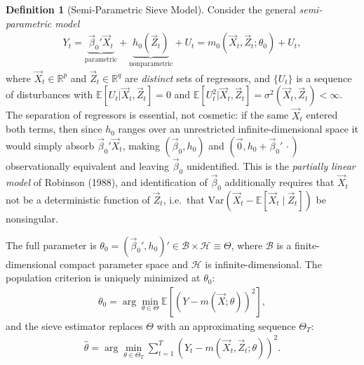 \documentclass[11pt]{article}
\theoremstyle{definition}
\newtheorem{definition}{Definition}[section]
\theoremstyle{plain}
\theoremstyle{remark}
\begin{document}
\begin{definition}[Semi-Parametric Sieve Model]
    Consider the general \textit{semi-parametric model}
    \begin{align}
        Y_t = \underbrace{\vec{\beta}_0' \vec{X}_t}_{\text{parametric}} + \underbrace{h_0(\vec{Z}_t)}_{\text{nonparametric}} + U_t = m_0(\vec{X}_t, \vec{Z}_t; \theta_0) + U_t,
    \end{align}
    where $\vec{X}_t \in \mathbb{R}^p$ and $\vec{Z}_t \in \mathbb{R}^q$ are \emph{distinct} sets of regressors, and $\{U_t\}$ is a sequence of disturbances with $\mathbb{E}[U_t | \vec{X}_t, \vec{Z}_t] = 0$ and $\mathbb{E}[U_t^2 | \vec{X}_t, \vec{Z}_t] = \sigma^2(\vec{X}_t,\vec{Z}_t) < \infty$. The separation of regressors is essential, not cosmetic: if the same $\vec{X}_t$ entered both terms, then since $h_0$ ranges over an unrestricted infinite-dimensional space it would simply absorb $\vec{\beta}_0'\vec{X}_t$, making $(\vec{\beta}_0, h_0)$ and $(\vec{0}, h_0 + \vec{\beta}_0'\,\cdot)$ observationally equivalent and leaving $\vec{\beta}_0$ unidentified. This is the \emph{partially linear model} of Robinson (1988), and identification of $\vec{\beta}_0$ additionally requires that $\vec{X}_t$ not be a deterministic function of $\vec{Z}_t$, i.e.\ that $\mathrm{Var}(\vec{X}_t - \mathbb{E}[\vec{X}_t \mid \vec{Z}_t])$ be nonsingular.

    The full parameter is $\theta_0 = (\vec{\beta}_0', h_0)' \in \mathcal{B} \times \mathcal{H} \equiv \Theta$, where $\mathcal{B}$ is a finite-dimensional compact parameter space and $\mathcal{H}$ is infinite-dimensional. The population criterion is uniquely minimized at $\theta_0$:
    \begin{align}
        \theta_0 = \arg\min_{\theta \in \Theta} \mathbb{E}\!\left[\left(Y - m(\vec{X};\theta)\right)^2\right],
    \end{align}
    and the sieve estimator replaces $\Theta$ with an approximating sequence $\Theta_T$:
    \begin{align}
        \hat{\theta} = \arg\min_{\theta \in \Theta_T} \sum_{t=1}^T \left(Y_t - m(\vec{X}_t, \vec{Z}_t;\theta)\right)^2.
    \end{align}
\end{definition}
\end{document}
